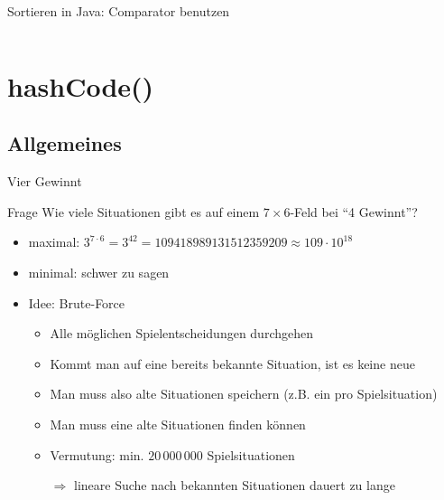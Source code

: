 \documentclass[usepdftitle=false,hyperref={pdfpagelabels=false}]{beamer}
\begin{document}
\begin{frame}{Sortieren in Java: Comparator benutzen}
    \inputminted[linenos=true, numbersep=5pt, tabsize=4, fontsize=\tiny]{java}{ComparatorMain.java}
\end{frame}

\section{hashCode()}
\subsection{Allgemeines}
\begin{frame}{Vier Gewinnt}
    \begin{block}{Frage}
        Wie viele Situationen gibt es auf einem $7 \times 6$-Feld
        bei "`4 Gewinnt"'?
    \end{block}

    \begin{itemize}[<+->]
        \item maximal: $3^{7 \cdot 6} = 3^{42} = 109418989131512359209 \approx 109 \cdot 10^{18}$
        \item minimal: schwer zu sagen
        \item Idee: Brute-Force 
        \begin{itemize}
            \item Alle möglichen Spielentscheidungen durchgehen
            \item Kommt man auf eine bereits bekannte Situation, ist es keine neue
            \item Man muss also alte Situationen speichern (z.B. ein  pro Spielsituation)
            \item Man muss eine alte Situationen finden können
            \item Vermutung: min. $20\,000\,000$ Spielsituationen
            \item[$\Rightarrow$] lineare Suche nach bekannten Situationen dauert zu lange
        \end{itemize}
    \end{itemize}
\end{frame}
\end{document}
